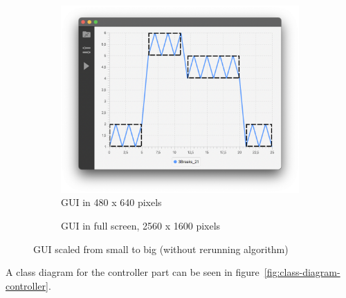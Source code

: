 \begin{figure}[ht]
    \centering
    \begin{subfigure}[b]{.48\textwidth}
        \centering
        \includegraphics[width=\textwidth]{fig/gui-small-screen.png}
        \caption{GUI in 480 x 640 pixels}
        \label{fig:gui-small-screen}
    \end{subfigure}
    \hfill
    \begin{subfigure}[b]{.48\textwidth}
        \centering
        \caption{GUI in full screen, 2560 x 1600 pixels}
        \label{fig:gui-full-screen}
    \end{subfigure}
    \caption{GUI scaled from small to big (without rerunning algorithm)}
    \label{fig:gui-scaling}
\end{figure}

A class diagram for the controller part can be seen in
figure~\ref{fig:class-diagram-controller}. 

